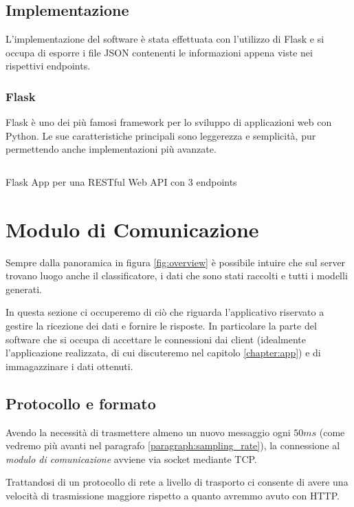 \subsection{Implementazione}
L'implementazione del software è stata effettuata con l'utilizzo di Flask e si occupa di esporre i 
file JSON contenenti le informazioni appena viste nei rispettivi endpoints.

\subsubsection{Flask}
Flask \cite{flask} è uno dei più famosi framework per lo sviluppo di applicazioni web 
con Python. Le sue caratteristiche principali sono leggerezza e semplicità, pur permettendo anche implementazioni 
più avanzate.


\begin{listing}[H] 
    \inputminted[frame=single,framesep=10pt]{python}{assets/snippets/server/api/flask.py}
    \caption{Flask App per una RESTful Web API con 3 endpoints}
\end{listing}



\section{Modulo di Comunicazione}
\label{section:receiver}
Sempre dalla panoramica in figura \ref{fig:overview} è possibile intuire che sul server 
trovano luogo anche il classificatore, i dati che sono stati raccolti e tutti i modelli generati. 

In questa sezione ci occuperemo di ciò che riguarda l'applicativo riservato a gestire la ricezione dei dati e fornire le risposte. 
In particolare la parte del software che si occupa di accettare le connessioni dai client (idealmente l'applicazione realizzata, di cui 
discuteremo nel capitolo \ref{chapter:app}) e di immagazzinare i dati ottenuti.

\subsection{Protocollo e formato}
Avendo la necessità di trasmettere almeno un nuovo messaggio ogni $50ms$ (come vedremo più avanti nel 
paragrafo \ref{paragraph:sampling_rate}), la connessione al \textit{modulo di comunicazione} avviene via socket mediante TCP. 

Trattandosi di un 
protocollo di rete a livello di trasporto ci consente di avere una velocità 
di trasmissione maggiore rispetto a quanto avremmo avuto con HTTP. 

